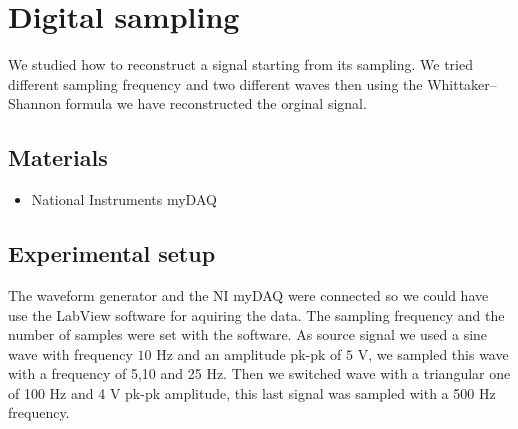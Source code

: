 \chapter{Digital sampling}
We studied how to reconstruct a signal starting from its sampling. We tried different sampling frequency and two different waves then using the Whittaker–Shannon formula we have reconstructed the orginal signal. 

\section{Materials}
\begin{itemize}
\item National Instruments myDAQ
\end{itemize}
\section{Experimental setup}
The waveform generator and the NI myDAQ were connected so we could have use the LabView software for aquiring the data. The sampling frequency and the number of samples were set with the software. As source signal we used a sine wave with frequency $10$ Hz and an amplitude pk-pk of $5$ V, we sampled this wave with a frequency of 5,10 and 25 Hz. Then we switched wave with a triangular one of 100 Hz and 4 V pk-pk amplitude, this last signal was sampled with a 500 Hz frequency.
